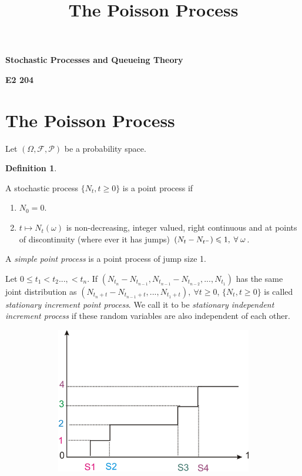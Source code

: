 \documentclass[11 pt]{article}
\theoremstyle{plain}
\theoremstyle{definition}
\newtheorem{defn}{Definition}[section]
\theoremstyle{remark}
\begin{document}
\vspace*{\fill}
\begingroup
\centering
\LARGE{\textbf{Stochastic Processes and Queueing Theory}} 

\LARGE{\textbf{E2  204}}

\endgroup
\vspace*{\fill}


\newpage




\newpage

\title{\Large{\textbf{The Poisson Process}} }
\date{}
 \maketitle
\section{The Poisson Process}
Let \noindent $(\Omega, \mathcal{F}, \mathcal{P})$ be a probability space.
\begin{defn}
\end{defn} 
A stochastic process $\{N_{t}, t\geqslant 0\}$ is a point process if\\
\vspace{-0.7cm}
\begin{enumerate}
  \item $N_{0} = 0$.
  \item $t\mapsto N_{t} (\omega)$ is non-decreasing, integer valued, right continuous and at points of discontinuity (where ever it has jumps) $(N_{t}- N_{t^{-}})\leqslant 1, \hspace{0.1cm} \forall \hspace{0.1cm} \omega$. 
\end{enumerate}
A \textit{simple point process} is a point process of jump size 1.

\noindent Let $0\leq t_{1}<t_{2}...,<t_{n}$. If $(N_{t_{n}}-N_{t_{n-1}},N_{t_{n-1}}-N_{t_{n-2}},...,N_{t_{1}})$ has the same joint distribution as $(N_{t_{n}+t}-N_{t_{n-1}+t},...,N_{t_{1}+t}), ~ \forall t \geqslant 0$, $\{N_{t}, t\geqslant 0\}$ is called \textit{stationary increment point process}. We call it to be \textit{stationary independent increment process} if these random variables are also independent of each other.\\

\begin{figure}[h!]
\center
  \includegraphics[width=5in, height=2.5in]{notes.png}\\
\end{figure}
\end{document}
